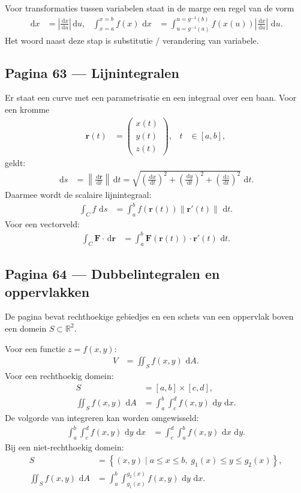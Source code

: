 \documentclass[11pt]{article}
\newcommand{\dd}{\,\mathrm{d}}
\newcommand{\td}[2]{\frac{\dd #1}{\dd #2}}
\newcommand{\vect}[1]{\mathbf{#1}}
\newcommand{\onzeker}[1]{\textcolor{red!70!black}{#1}}
\newcommand{\R}{\mathbb{R}}
\begin{document}
Voor transformaties tussen variabelen staat in de marge een regel van de vorm
\begin{align*}
\dd x
&=
\left|\td{x}{u}\right|\dd u,
&
\int_{x=a}^{x=b} f(x)\,\dd x
&=
\int_{u=g^{-1}(a)}^{u=g^{-1}(b)}
f(x(u))\left|\td{x}{u}\right|\,\dd u.
\end{align*}
Het woord naast deze stap is \onzeker{substitutie / verandering van variabele}.

\subsection*{Pagina 63 --- Lijnintegralen}

Er staat een curve met een parametrisatie en een integraal over een baan. Voor een kromme
\begin{align*}
\vect{r}(t)
&=
\begin{pmatrix}
x(t)\\
y(t)\\
z(t)
\end{pmatrix},
&
t&\in[a,b],
\end{align*}
geldt:
\begin{align*}
\dd s
&=
\left\|\td{\vect{r}}{t}\right\|\dd t
=
\sqrt{
\left(\td{x}{t}\right)^2+
\left(\td{y}{t}\right)^2+
\left(\td{z}{t}\right)^2
}\,\dd t.
\end{align*}
Daarmee wordt de scalaire lijnintegraal:
\begin{align*}
\int_C f\,\dd s
&=
\int_a^b f(\vect{r}(t))
\left\|\vect{r}'(t)\right\|\,\dd t.
\end{align*}
Voor een vectorveld:
\begin{align*}
\int_C \vect{F}\cdot\dd\vect{r}
&=
\int_a^b
\vect{F}(\vect{r}(t))\cdot \vect{r}'(t)\,\dd t.
\end{align*}

\subsection*{Pagina 64 --- Dubbelintegralen en oppervlakken}

De pagina bevat rechthoekige gebiedjes en een schets van een oppervlak boven een domein $S\subset\R^2$.

Voor een functie $z=f(x,y)$:
\begin{align*}
V
&=
\iint_S f(x,y)\,\dd A.
\end{align*}
Voor een rechthoekig domein:
\begin{align*}
S&=[a,b]\times[c,d],\\
\iint_S f(x,y)\,\dd A
&=
\int_a^b\int_c^d f(x,y)\,\dd y\,\dd x.
\end{align*}
De volgorde van integreren kan worden omgewisseld:
\begin{align*}
\int_a^b\int_c^d f(x,y)\,\dd y\,\dd x
&=
\int_c^d\int_a^b f(x,y)\,\dd x\,\dd y.
\end{align*}
Bij een niet-rechthoekig domein:
\begin{align*}
S
&=
\left\{(x,y)\mid a\le x\le b,\; g_1(x)\le y\le g_2(x)\right\},\\
\iint_S f(x,y)\,\dd A
&=
\int_a^b\int_{g_1(x)}^{g_2(x)}
f(x,y)\,\dd y\,\dd x.
\end{align*}
\end{document}
